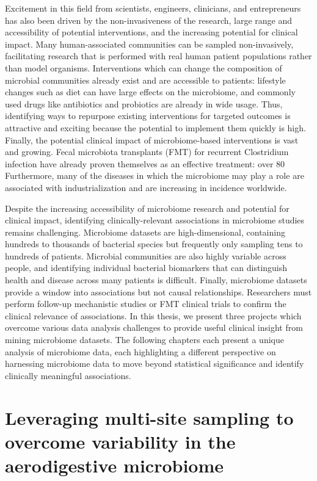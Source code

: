 Excitement in this field from scientists, engineers, clinicians, and entrepreneurs has also been driven by the non-invasiveness of the research, large range and accessibility of potential interventions, and the increasing potential for clinical impact.
Many human-associated communities can be sampled non-invasively, facilitating research that is performed with real human patient populations rather than model organisms.
Interventions which can change the composition of microbial communities already exist and are accessible to patients: lifestyle changes such as diet can have large effects on the microbiome, and commonly used drugs like antibiotics and probiotics are already in wide usage.
Thus, identifying ways to repurpose existing interventions for targeted outcomes is attractive and exciting because the potential to implement them quickly is high.
Finally, the potential clinical impact of microbiome-based interventions is vast and growing.
Fecal microbiota transplants (FMT) for recurrent Clostridium infection have already proven themselves as an effective treatment: over 80%
Furthermore, many of the diseases in which the microbiome may play a role are associated with industrialization and are increasing in incidence worldwide.

Despite the increasing accessibility of microbiome research and potential for clinical impact, identifying clinically-relevant associations in microbiome studies remains challenging.
Microbiome datasets are high-dimensional, containing hundreds to thousands of bacterial species but frequently only sampling tens to hundreds of patients.
Microbial communities are also highly variable across people, and identifying  individual bacterial biomarkers that can distinguish health and disease across many patients is difficult.
Finally, microbiome datasets provide a window into associations but not causal relationships.
Researchers must perform follow-up mechanistic studies or FMT clinical trials to confirm the clinical relevance of associations.
In this thesis, we present three projects which overcome various data analysis challenges to provide useful clinical insight from mining microbiome datasets.
The following chapters each present a unique analysis of microbiome data, each highlighting a different perspective on harnessing microbiome data to move beyond statistical significance and identify clinically meaningful associations.

\section{Leveraging multi-site sampling to overcome variability in the aerodigestive microbiome}


